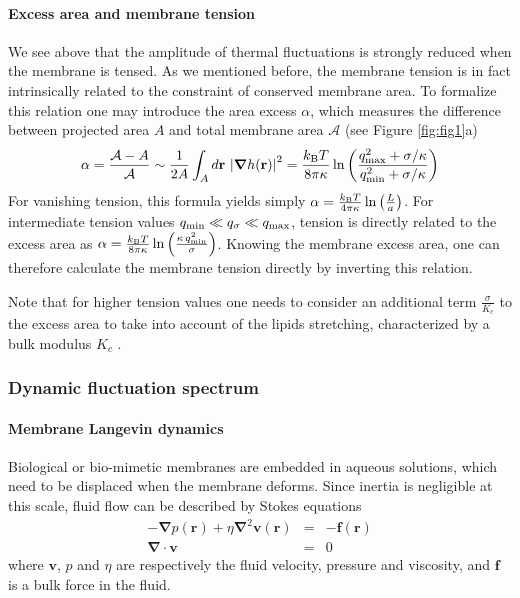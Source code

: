 \documentclass[graybox]{svmult}
\begin{document}
			\paragraph{\textbf{Excess area and membrane tension}}
We see above that the amplitude of thermal fluctuations is strongly reduced when the membrane is tensed. 
As we mentioned before, the membrane tension is in fact intrinsically related to the constraint of conserved membrane area. To formalize this relation one may introduce the area excess $\alpha$, which measures the difference between projected area $A$ and total membrane area $\mathcal{A}$ \cite{Helfrich:1984} (see Figure \ref{fig:fig1}a)
\begin{equation}
	\label{eq:Surface_excess}
	\alpha = \frac{\mathcal{A}-A}{\mathcal{A}} \sim \frac{1}{2A}\int_A d\mathbf{r} \,\left|\boldsymbol{\nabla}h(\mathbf{r})\right|^2 = \frac{k_{\rm{B}}T}{8\pi\kappa}\ln\left(\frac{q_{\rm{max}}^2 + \sigma/\kappa}{q_{\rm{min}}^2+ \sigma/\kappa}\right)
\end{equation}
For vanishing tension, this formula yields simply $\alpha = \frac{k_{\rm{B}}T}{4\pi\kappa}\ln\left(\frac{L}{a}\right)$.
For intermediate tension values $q_{\rm{min}} \ll q_{\sigma} \ll q_{\rm{max}}$, tension is directly related to the excess area as $\alpha = \frac{k_{\rm{B}}T}{8\pi\kappa}\ln\left(\frac{\kappa\,q_{\rm{min}}^2}{\sigma}\right)$. Knowing the membrane excess area, one can therefore calculate the membrane tension directly by inverting this relation.

Note that for higher tension values one needs to consider an additional term $\frac{\sigma}{K_c}$ to the excess area to take into account of the lipids stretching, characterized by a bulk modulus $K_c$ \cite{Fournier:2001}.

		\subsubsection{Dynamic fluctuation spectrum}
			\label{sec:DynamicFluctuationSpectrum}
			
			\paragraph{\textbf{Membrane Langevin dynamics}}
Biological or bio-mimetic membranes are embedded in aqueous solutions, which need to be displaced when the membrane deforms. Since inertia is negligible at this scale, fluid flow can be described by Stokes equations
\begin{eqnarray}
	 - \boldsymbol{\nabla} p(\mathbf{r}) + \eta \boldsymbol{\nabla}^2\mathbf{v}(\mathbf{r}) &=& - \mathbf{f}(\mathbf{r}) \\
	 \boldsymbol{\nabla} \cdot\mathbf{v} &=& 0
\end{eqnarray}
where $\mathbf{v}$, $p$ and $\eta$ are respectively the fluid velocity, pressure and viscosity, and $\mathbf{f}$ is a bulk force in the fluid.
\end{document}
